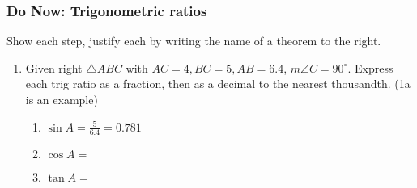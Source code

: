 \documentclass[12pt, oneside]{article}
\begin{document}
\subsubsection*{Do Now: Trigonometric ratios}
Show each step, justify each by writing the name of a theorem to the right.  \begin{enumerate}

  \item Given right $\triangle ABC$ with $AC=4, BC=5, AB=6.4$, $m\angle C=90^\circ$. Express each trig ratio as a fraction, then as a decimal to the nearest thousandth. (1a is an example)
  \begin{center}
  \end{center}
    \begin{enumerate}
      \item $\displaystyle \sin A = \frac{5}{6.4} = 0.781$ \vspace{1cm}
      \item $\cos A =$ \vspace{1cm}
      \item $\tan A =$
    \end{enumerate}


\end{enumerate}
\end{document}
